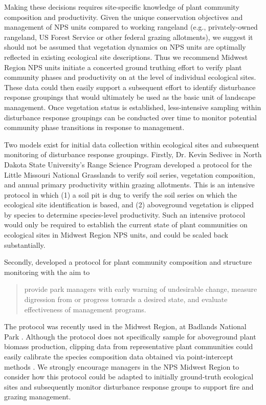 Making these decisions requires site-specific knowledge of plant community composition and productivity. 
Given the unique conservation objectives and management of NPS units compared to working rangeland (e.g., privately-owned rangeland, US Forest Service or other federal grazing allotments), we suggest it should not be assumed that vegetation dynamics on NPS units are optimally reflected in existing ecological site descriptions. 
Thus we recommend Midwest Region NPS units initiate a concerted ground truthing effort to verify plant community phases and productivity on at the level of individual ecological sites.
These data could then easily support a subsequent effort to identify disturbance response groupings \citep[as per][]{stringham2016} that would ultimately be used as the basic unit of landscape management.
Once vegetation status is established, less-intensive sampling within disturbance response groupings can be conducted over time to monitor potential community phase transitions in response to management. 

Two models exist for initial data collection within ecological sites and subsequent monitoring of disturbance response groupings. 
Firstly, Dr. Kevin Sedivec in North Dakota State University's Range Science Program developed a protocol for the Little Missouri National Grasslands to verify soil series, vegetation composition, and annual primary productivity within grazing allotments. 
This is an intensive protocol in which (1) a soil pit is dug to verify the soil series on which the ecological site identification is based, and (2) aboveground vegetation is clipped by species to determine species-level productivity. 
Such an intensive protocol would only be required to establish the current state of plant communities on ecological sites in Midwest Region NPS units, and could be scaled back substantially. 

Secondly, \citet{symstad2012} developed a protocol for plant community composition and structure monitoring with the aim to

\begin{quote}
	provide park managers with early warning of undesirable change, measure digression from or progress towards a desired state, and evaluate effectiveness of management programs.
\end{quote}

The protocol was recently used in the Midwest Region, at Badlands National Park \citep{ashton2019}. 
Although the protocol does not specifically sample for aboveground plant biomass production, clipping data from representative plant communities could easily calibrate the species composition data obtained via point-intercept methods \citep{yurkonis2012}.
We strongly encourage managers in the NPS Midwest Region to consider how this protocol could be adapted to initially ground-truth ecological sites and subsequently monitor disturbance response groups to support fire and grazing management. 


